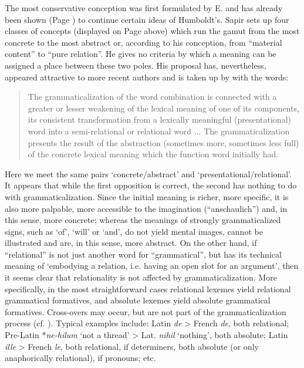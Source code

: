 The most conservative conception was first formulated by E. \citet[Ch.~V]{Sapir1921} and has already been shown (Page \pageref{SapirHumCh4}) to continue certain ideas of Humboldt's. Sapir sets up four classes of concepts (displayed on Page \pageref{SapirHumCh4} above) which run the gamut from the most concrete to the most abstract or, according to his conception, from “material content” to “pure relation”. He gives no criteria by which a meaning can be assigned a place between these two poles. His proposal has, nevertheless, appeared attractive to more recent authors and is taken up by \citet[83]{Žirmunskij1966} with the words:

\begin{quotation}
The grammaticalization of the word combination is connected with a greater or lesser weakening of the lexical meaning of one of its components, its consistent transformation from a lexically meaningful (presentational) word into a semi-relational or relational word ... The grammaticalization presents the result of the abstraction (sometimes more, sometimes less full) of the concrete lexical meaning which the function word initially had.
\end{quotation}

\noindent Here we meet the same pairs ‘concrete/abstract’ and ‘presentational/relational’. It appears that while the first opposition is correct, the second has nothing to do with grammaticalization. Since the initial meaning is richer, more specific, it is also more palpable, more accessible to the imagination (“anschaulich”) and, in this sense, more concrete; whereas the meanings of strongly grammaticalized signs, such as ‘of’, ‘will’ or ‘and’, do not yield mental images, cannot be illustrated and are, in this sense, more abstract. On the other hand, if ``relational'' is not just another word for ``grammatical'', but has its technical meaning of ‘embodying a relation, i.e. having an open slot for an argument’, then it seems clear that relationality is not affected by grammaticalization. More specifically, in the most straightforward cases relational lexemes yield relational grammatical formatives, and absolute lexemes yield absolute grammatical formatives. Cross-overs may occur, but are not part of the grammaticalization process (cf. \pageref{page73}\chk%
). Typical examples include: Latin \textit{de} {\textgreater} French \textit{de}, both relational; Pre-Latin *\textit{ne-hilum} ‘not a thread’ {\textgreater} Lat. \textit{nihil} ‘nothing’, both absolute; Latin \textit{ille} {\textgreater} French \textit{le}, both relational, if determiners, both absolute (or only anaphorically relational), if pronouns; etc.

